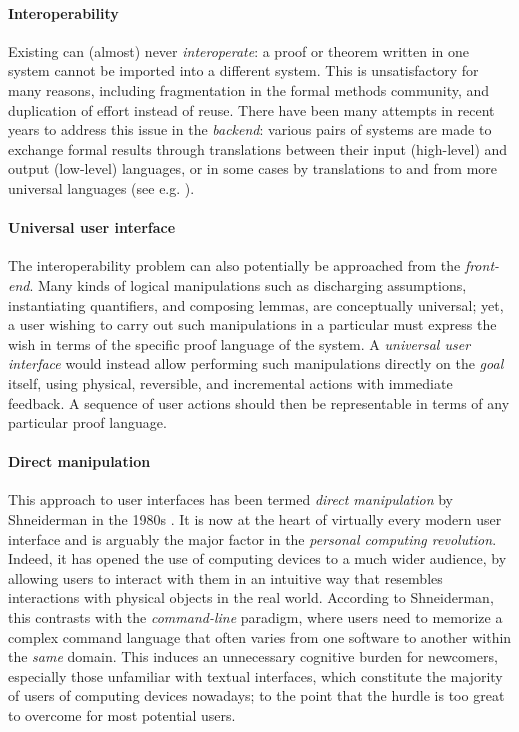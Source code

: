 \paragraph{Interoperability}

Existing  can (almost) never \emph{interoperate}: a proof or
theorem written in one system cannot be imported into a different system. This
is unsatisfactory for many reasons, including fragmentation in the formal
methods community, and duplication of effort instead of reuse. There have been
many attempts in recent years to address this issue in the \emph{backend}:
various pairs of systems are made to exchange formal results through
translations between their input (high-level) and output (low-level) languages,
or in some cases by translations to and from more universal languages (see e.g.
).

\paragraph{Universal user interface}

The interoperability problem can also potentially be approached from the
\emph{front-end}. Many kinds of logical manipulations such as discharging
assumptions, instantiating quantifiers, and composing lemmas, are conceptually
universal; yet, a user wishing to carry out such manipulations in a particular
 must express the wish in terms of the specific proof language of
the system. A \emph{universal user interface} would instead allow performing
such manipulations directly on the \emph{goal} itself, using physical,
reversible, and incremental actions with immediate feedback. A sequence of user
actions should then be representable in terms of any particular proof language.

\paragraph{Direct manipulation}

This approach to user interfaces has been termed \emph{direct manipulation} by
Shneiderman in the 1980s . It is now at the
heart of virtually every modern user interface and is arguably the major factor
in the \emph{personal computing revolution}. Indeed, it has opened the use of
computing devices to a much wider audience, by allowing users to interact with
them in an intuitive way that resembles interactions with physical objects in
the real world. According to Shneiderman, this contrasts with the
\emph{command-line} paradigm, where users need to memorize a complex command
language that often varies from one software to another within the \emph{same}
domain. This induces an unnecessary cognitive burden for newcomers, especially
those unfamiliar with textual interfaces, which constitute the majority of users
of computing devices nowadays; to the point that the hurdle is too great to
overcome for most potential users.

